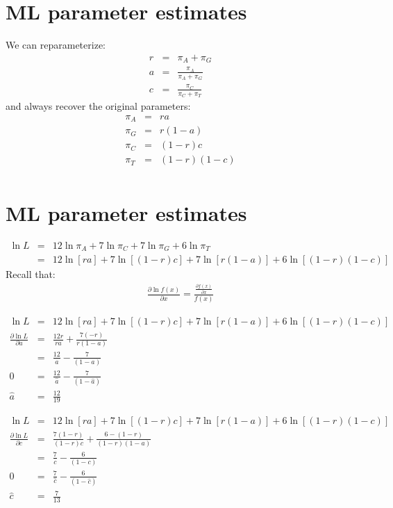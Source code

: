 \documentclass[landscape]{foils}
\begin{document}
\section*{ML parameter estimates}
\normalsize
We can reparameterize:
\begin{eqnarray*}
	r & = & {\pi_A+\pi_G} \\
   a  & = & \frac{\pi_A}{\pi_A+\pi_G} \\
   c & = & \frac{\pi_C}{\pi_C+\pi_T}
\end{eqnarray*}
and always recover the original parameters:
\begin{eqnarray*}
	\pi_A & = & ra \\
	\pi_G & = & r(1-a) \\
	\pi_C & = & (1-r)c \\
	\pi_T & = & (1-r)(1-c) \\
\end{eqnarray*}

\myNewSlide
\section*{ML parameter estimates}
\begin{eqnarray*}
	\ln L & = & 12 \ln\pi_A + 7 \ln\pi_C + 7 \ln\pi_G + 6 \ln\pi_T \\
	& = & 12 \ln\left[ra\right] + 7 \ln\left[(1-r)c\right] + 7 \ln\left[r(1-a)\right] + 6 \ln\left[(1-r)(1-c)\right] 
\end{eqnarray*}
Recall that:
\begin{eqnarray*}
	\frac{\partial \ln f(x)}{\partial x} =\frac{\frac{\partial f(x)}{\partial x}}{f(x)}
\end{eqnarray*}


\myNewSlide
\begin{eqnarray*}
	\ln L & = & 12 \ln\left[ra\right] + 7 \ln\left[(1-r)c\right] + 7 \ln\left[r(1-a)\right] + 6 \ln\left[(1-r)(1-c)\right]  \\
	\frac{\partial \ln L}{\partial a} & = &\frac{12 r}{ra} + \frac{7(-r)}{r(1-a)} \\
	& = & \frac{12}{a} -\frac{7}{(1-a)}\\
	 0 & = & \frac{12}{\hat{a}} -\frac{7}{(1-\hat{a})}  \\
	 \hat{a} & = & \frac{12}{19}
\end{eqnarray*}

\myNewSlide
\begin{eqnarray*}
	\ln L & = & 12 \ln\left[ra\right] + 7 \ln\left[(1-r)c\right] + 7 \ln\left[r(1-a)\right] + 6 \ln\left[(1-r)(1-c)\right]  \\
	\frac{\partial \ln L}{\partial c} & = &\frac{7 (1-r)}{(1-r)c} + \frac{6-(1-r)}{(1-r)(1-a)} \\
	& = & \frac{7}{c} -\frac{6}{(1-c)}\\
	 0 & = & \frac{7}{\hat{c}} -\frac{6}{(1-\hat{c})}  \\
	 \hat{c} & = & \frac{7}{13}
\end{eqnarray*}
\end{document}
